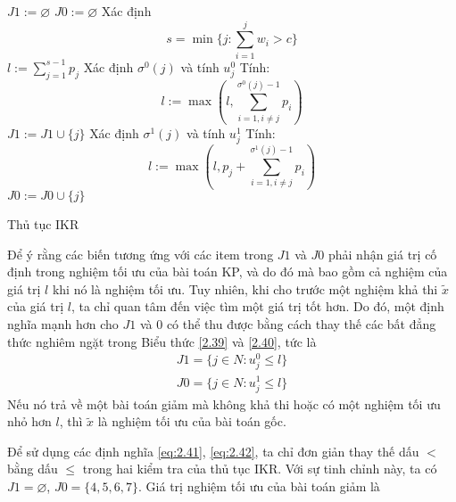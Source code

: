 \begin{algorithm}[H]
    \DontPrintSemicolon
    \vspace{1em}
    \vspace{1em}
    $J1 := \varnothing$\;
    $J0 := \varnothing$\;
    Xác định 
    \begin{equation}
        s = \min\{j : \sum_{i=1}^jw_i > c\}
    \end{equation}\;
    $l:=\sum_{j = 1}^{s - 1}p_j$\;
    {
        Xác định $\sigma^0(j)$ và tính $u^0_j$\;
        Tính:
        \begin{equation*}
            l:=\max\left(l, \sum_{i=1, i \ne j}^{\sigma^0(j) - 1}p_i\right)
        \end{equation*}\;
        {
            $J1 := J1 \cup \{j\}$
        }
    }
    {
        Xác định $\sigma^1(j)$ và tính $u^1_j$\;
        Tính:
        \begin{equation*}
            l:=\max\left(l, p_j + \sum_{i=1, i \ne j}^{\sigma^1(j) - 1}p_i\right)
        \end{equation*}\;
        {
            $J0 := J0 \cup \{j\}$
        }
    }
    \caption{Thủ tục IKR}
    \label{algo:ikr}
\end{algorithm}

Để ý rằng các biến tương ứng với các item trong $J1$ và $J0$ phải nhận giá trị cố định trong nghiệm tối ưu của bài toán KP, và do đó mà bao gồm cả nghiệm của giá trị $l$ khi nó là nghiệm tối ưu. Tuy nhiên, khi cho trước một nghiệm khả thi $\widetilde{x}$ của giá trị $l$, ta chỉ quan tâm đến việc tìm một giá trị tốt hơn. Do đó, một định nghĩa mạnh hơn cho $J1$ và $0$ có thể thu được bằng cách thay thế các bất đẳng thức nghiêm ngặt trong Biểu thức \eqref{2.39} và \eqref{2.40}, tức là 
\begin{align}
    \label{eq:2.41}
    J1 = \{ j\in N: u^0_j \leq l\} \\
    \label{eq:2.42}
    J0 = \{ j\in N: u^1_j \leq l\}
\end{align}
Nếu nó trả về một bài toán giảm mà không khả thi hoặc có một nghiệm tối ưu nhỏ hơn $l$, thì $\tilde{x}$ là nghiệm tối ưu của bài toán gốc.

    

Để sử dụng các định nghĩa \eqref{eq:2.41}, \eqref{eq:2.42}, ta chỉ đơn giản thay thế dấu $<$ bằng dấu $\leq$ trong hai kiểm tra của thủ tục IKR. Với sự tinh chỉnh này, ta có $J1 = \varnothing$, $J0 = \{4, 5, 6, 7\}$. Giá trị nghiệm tối ưu của bài toán giảm là 

